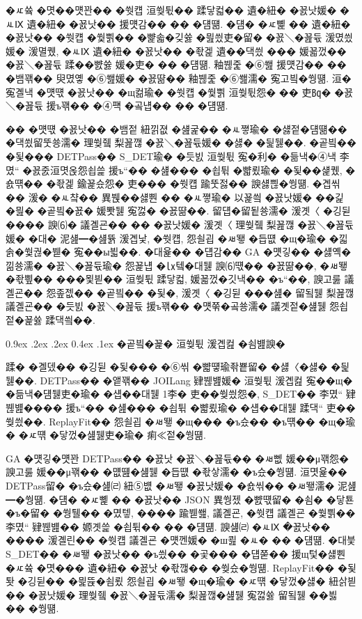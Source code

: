 \documentclass[10pt,twocolumn]{article}
\makeatletter
\renewcommand{\subsection}{\@startsection{subsection}{2}{\z@}%
{0.9ex \@plus .2ex \@minus .2ex}%
{0.4ex \@plus .1ex}%
{\normalfont\normalsize\bfseries}}
\makeatother
\begin{document}
�ㅼ쓬 �몃��먯꽌�� �쒓컙 洹쒖튃�� 蹂닿컯�� 遺�紐� �꾨낫媛� �ㅻⅨ 遺�紐� �꾨낫�� 援먯감�� �� �덈떎. �덈� �ㅼ뼱 �� 遺�紐� �꾨낫�� �쒓컙 �쒗쁽�� �뺥솗�깆쓣 �믪씠吏�留� �꾨＼�꾪듃 湲몄씠媛� 湲멸퀬, �ㅻⅨ 遺�紐� �꾨낫�� �좏겙 遺��댁씠 ��� 媛꾧껐�� �꾨＼�꾪듃 蹂��뺤쓣 媛�吏� �� �덈떎. 釉붾줉 �⑥쐞 援먯감�� �� �뱀꽦�� 臾몄옣 �⑥쐞媛� �꾨땲�� 釉붾줉 �⑥쐞濡� 寃고빀�쒕떎. 洹� 寃곌낵 �먯떇 �꾨낫�� �щ컮瑜� �쒓컙 �쒗쁽 洹쒖튃怨� �� 吏㏃� �꾨＼�꾪듃 援ъ꽦�� �④퍡 �곸냽�� �� �덈떎.

�� �먯떇 �꾨낫�� �뱀젙 紐낅졊 �섎굹�� �ㅻ쪟瑜� �섏젙�덈떎�� �댁쑀留뚯쑝濡� 理쒖쥌 梨꾪깮 �꾨＼�꾪듃媛� �섏� �딅뒗��. �곹빀�� �됯��� DETPass�� S\_DET瑜� �듯빐 洹쒖튃 寃�利� �듦낵�④낵 李몄“ �꾨줈洹몃옩怨쇱쓽 援ъ“�� �섎��� �쇱튂 �뺣룄瑜� �됯��섍퀬, �숈떆�� �좏겙 鍮꾩슜怨� 吏��� �쒓컙 踰뚯젏�� 諛섏쁺�쒕떎. �곕씪�� 湲� �ㅻ챸�� 異붽��섏뿬 �� �ㅻ쪟瑜� 以꾩씤 �꾨낫媛� ��긽 �믪� �곹빀�꾨� 媛뽯뒗 寃껋� �꾨땲��. 留덉�留됱쑝濡� 湲곗〈 �깅뒫 ���� 諛⑹� 議곌굔�� �� �꾨낫媛� 湲곗〈 理쒖쥌 梨꾪깮 �꾨＼�꾪듃媛� �대� 泥섎━�섎뜕 湲곕낯, �쒓컙, 怨쇨굅 �ㅽ뙣 �듭떖 �щ�瑜� �낇솕�쒗궎�붿� 寃��ы븳��. �대윭�� �덉감�� GA �먯깋�� �섏옉�낆쑝濡� �꾨＼�꾪듃瑜� 怨꾩냽 �㏓텤�대뒗 諛⑹떇�� �꾨땲��, �ㅽ뙣 �좏삎�� ���묓븯�� 洹쒖튃 蹂닿컯, 媛꾧껐�깃낵�� �ъ“��, 諛고룷 議곌굔�� 怨좊젮�� �곹빀�� �됯�, 湲곗〈 �깅뒫 ���섎� 留됰뒗 梨꾪깮 議곌굔�� �듯빐 �꾨＼�꾪듃 援ъ꽦�� �먯쭊�곸쑝濡� 議곗젙�섎뒗 怨쇱젙�꾩쓣 蹂댁씤��.

\subsection{�곹빀�꾩� 洹쒖튃 湲곕컲 �쇰뱶諛�}

蹂� �곌뎄�� �깅뒫 �됯��� �⑥씪 �뺣떟瑜좎뿉留� �섏〈�섏� �딅뒗��. DETPass�� �앹꽦�� JOILang 肄붾뱶媛� 洹쒖튃 湲곕컲 寃��щ� �듦낵�덈뒗吏�瑜� �섑��대뒗 1李� 吏��쒖씠怨�, S\_DET�� 李몄“ 肄붾뱶���� 援ъ“�� �섎��� �쇱튂 �뺣룄瑜� �섑��대뒗 蹂댁“ 吏��쒖씠��. ReplayFit�� 怨쇨굅 �ㅽ뙣 �щ��� �ъ슜�� �ъ떆�� �щ�瑜� �ㅼ떆 �닿껐�섎뒗吏�瑜� 痢≪젙�쒕떎.

GA �먯깋�먯꽌 DETPass�� �꾨낫 �꾨＼�꾪듃�� �ㅽ뻾 媛��μ꽦怨� 諛고룷 媛��μ꽦�� �먮떒�섎뒗 �듭떖 �좏샇濡� �ъ슜�쒕떎. 洹몃윭�� DETPass留� �ъ슜�섎㈃ 紐⑤뱺 �ㅽ뙣 �꾨낫媛� �숈씪�� �ㅽ뙣濡� 泥섎━�쒕떎. �덈� �ㅼ뼱 �� �꾨낫�� JSON 異쒕젰 �뺤떇留� �쇰� �닿툔�ъ�留� �쒕퉬�� �몄텧, ���� 踰붿쐞, 議곌굔, �쒓컙 議곌굔 �쒗쁽�� 李몄“ 肄붾뱶�� 嫄곗쓽 �쇱튂�� �� �덈떎. 諛섎㈃ �ㅻⅨ �꾨낫�� ���� 湲곌린�� �쒓컙 議곌굔 �먯껜媛� �ш쾶 �ㅻ� �� �덈떎. �대븣 S\_DET�� �ㅽ뙣 �꾨낫�� �ъ씠�� �곷��� �덉쭏�� 援щ텇�섏뿬 �ㅼ쓬 �몃��� 遺�紐� �꾨낫 �좏깮�� �쒖슜�쒕떎. ReplayFit�� �됯퇏 �깅뒫�� �믩뜑�쇰룄 怨쇨굅 �ㅽ뙣 �щ�瑜� �ㅼ떆 �닿껐�섏� 紐삵븯�� �꾨낫媛� 理쒖쥌 �꾨＼�꾪듃濡� 梨꾪깮�섎뒗 寃껋쓣 留됰뒗 ��븷�� �쒕떎.
\end{document}

